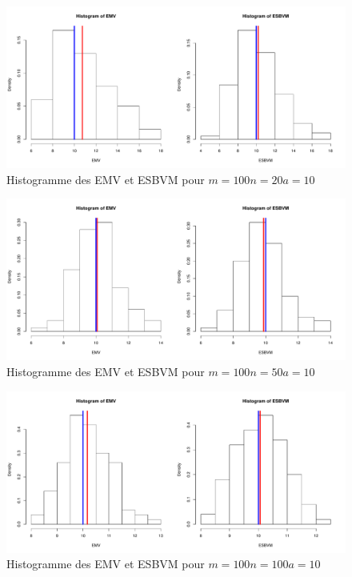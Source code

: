 \documentclass[12pt]{article}
\begin{document}
\begin{enumerate}
\begin{figure}[ht]
\label{graph1}
\centering
\includegraphics[width=1.0\textwidth]{figures/GraphP2Q32.pdf}
\caption{Histogramme des EMV et ESBVM pour $m=100 n=20 a=10$}
\end{figure}

\begin{figure}[ht]
\label{graph1}
\centering
\includegraphics[width=1.0\textwidth]{figures/GraphP2Q33.pdf}
\caption{Histogramme des EMV et ESBVM pour $m=100 n=50 a=10$}
\end{figure}

\begin{figure}[ht]
\label{graph1}
\centering
\includegraphics[width=1.0\textwidth]{figures/GraphP2Q34.pdf}
\caption{Histogramme des EMV et ESBVM pour $m=100 n=100 a=10$}
\end{figure}


\end{enumerate}
\end{document}

